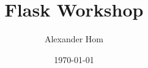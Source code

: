 \documentclass[12pt]{beamer}
\title{Flask Workshop}
\author{Alexander Hom}
\date{\today}
\begin{document}
    \frame{\titlepage}
\end{document}
